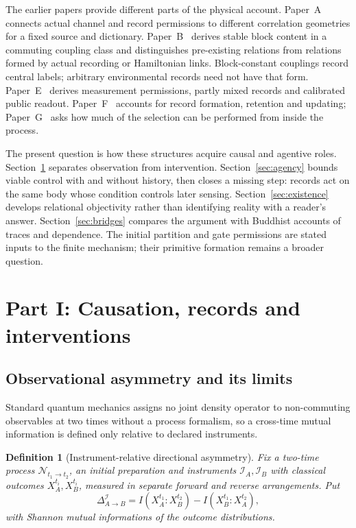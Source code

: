 \documentclass[11pt,a4paper]{article}
\newtheorem{definition}{Definition}[section]
\begin{document}
The earlier papers provide different parts of the physical account.
Paper~A~\cite{Liu2026PaperA} connects actual channel and record permissions
to different correlation geometries for a fixed source and dictionary.
Paper~B~\cite{Liu2026PaperB} derives stable block content in a commuting
coupling class and distinguishes pre-existing relations from relations
formed by actual recording or Hamiltonian links. Block-constant couplings
record central labels; arbitrary environmental records need not have that
form. Paper~E~\cite{Liu2026PaperE} derives measurement permissions,
partly mixed records and calibrated public readout. Paper~F~\cite{Liu2026PaperF}
accounts for record formation, retention and updating; Paper~G~\cite{Liu2026PaperG}
asks how much of the selection can be performed from inside the process.

The present question is how these structures acquire causal and agentive
roles. Section~\ref{sec:causation} separates observation from intervention.
Section~\ref{sec:agency} bounds viable control with and without history,
then closes a missing step: records act on the same body whose condition
controls later sensing. Section~\ref{sec:existence} develops relational
objectivity rather than identifying reality with a reader's answer.
Section~\ref{sec:bridges} compares the argument with Buddhist accounts of
traces and dependence. The initial partition and gate permissions are
stated inputs to the finite mechanism; their primitive formation remains
a broader question.

\section{Part I: Causation, records and interventions}
\label{sec:causation}

\subsection{Observational asymmetry and its limits}

Standard quantum mechanics assigns no joint density operator to non-commuting observables at two times without a process formalism, so a cross-time mutual information is defined only relative to declared instruments.

\begin{definition}[Instrument-relative directional asymmetry]
\label{def:asym}
Fix a two-time process $\mathcal N_{t_1\to t_2}$, an initial preparation and instruments $\mathcal I_A,\mathcal I_B$ with classical outcomes $X_A^{t_i},X_B^{t_i}$, measured in separate forward and reverse arrangements. Put
\[
\Delta^{\mathcal I}_{A\to B}=I(X_A^{t_1}:X_B^{t_2})-I(X_B^{t_1}:X_A^{t_2}),
\]
with Shannon mutual informations of the outcome distributions.
\end{definition}
\end{document}
